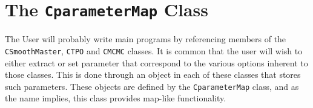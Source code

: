 \documentclass[UserManual.tex]{subfiles}
\begin{document}
\begin{sloppypar}

\section{The {\tt CparameterMap} Class}\label{sec:parametermap}

The User will probably write main programs by referencing members of the {\tt CSmoothMaster}, {\tt CTPO} and {\tt CMCMC} classes. It is common that the user will wish to either extract or set parameter that correspond to the various options inherent to those classes. This is done through an object in each of these classes that stores such parameters. These objects are defined by the {\tt CparameterMap} class, and as the name implies, this class provides map-like functionality. 


\end{sloppypar}
\end{document}
